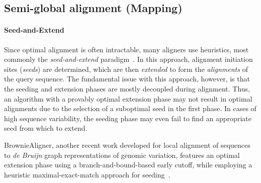 \subsection{Semi-global alignment (Mapping)}


\paragraph{Seed-and-Extend}
Since optimal alignment is often intractable, many aligners use heuristics, most
commonly the \emph{seed-and-extend}
paradigm~\cite{altschul_basic_1990,langmead_fast_2012,li_fast_2009}. In this
approach, alignment initiation sites (\emph{seeds}) are determined, which are
then \emph{extended} to form the \emph{alignments} of the query sequence. The
fundamental issue with this approach, however, is that the seeding and extension
phases are mostly decoupled during alignment. Thus, an algorithm with a provably
optimal extension phase may not result in optimal alignments due to the
selection of a suboptimal seed in the first phase. In cases of high sequence
variability, the seeding phase may even fail to find an appropriate seed from
which to extend.


BrownieAligner, another recent work developed for local alignment of sequences
to {\itshape de Bruijn} graph representations of genomic variation, features an
optimal extension phase using a branch-and-bound-based early cutoff, while
employing a heuristic maximal-exact-match approach for
seeding~\cite{heydari_browniealigner_2018}.